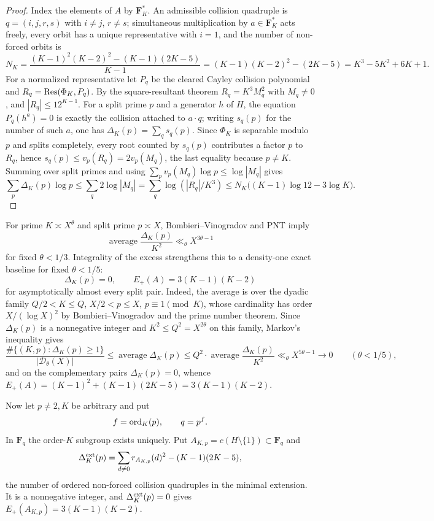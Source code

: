 \begin{proof}
Index the elements of $A$ by $\mathbf F_K^\ast$.  An admissible
collision quadruple is $q=(i,j,r,s)$ with $i\ne j$, $r\ne s$;
simultaneous multiplication by $a\in\mathbf F_K^\ast$ acts freely,
every orbit has a unique representative with $i=1$, and the number
of non-forced orbits is
\[
N_K=\frac{(K-1)^2(K-2)^2-(K-1)(2K-5)}{K-1}
   =(K-1)(K-2)^2-(2K-5)=K^3-5K^2+6K+1.
\]
For a normalized representative let $P_q$ be the cleared Cayley
collision polynomial and $R_q=\operatorname{Res}(\Phi_K,P_q)$.  By the
square-resultant theorem $R_q=K^3M_q^2$ with $M_q\ne0$, and
$|R_q|\le12^{K-1}$.  For a split prime $p$ and a generator $h$ of
$H$, the equation $P_q(h^a)=0$ is exactly the collision attached to
$a\cdot q$; writing $s_q(p)$ for the number of such $a$, one has
$\Delta_K(p)=\sum_q s_q(p)$.  Since $\Phi_K$ is separable modulo
$p$ and splits completely, every root counted by $s_q(p)$
contributes a factor $p$ to $R_q$, hence
$s_q(p)\le v_p(R_q)=2v_p(M_q)$, the last equality because $p\ne K$.
Summing over split primes and using
$\sum_p v_p(M_q)\log p\le\log|M_q|$ gives
\[
\sum_p\Delta_K(p)\log p
\le\sum_q2\log|M_q|
=\sum_q\log(|R_q|/K^3)
\le N_K\bigl((K-1)\log12-3\log K\bigr).
\]
\end{proof}

For prime $K\asymp X^\theta$ and split prime $p\asymp X$,
Bombieri--Vinogradov and PNT \cite{Bombieri1965,IK2004} imply
\[
\operatorname{average}\frac{\Delta_K(p)}{K^2}
 \ll_\theta X^{3\theta-1}
\]
for fixed $\theta<1/3$.  Integrality of the excess strengthens this to a
density-one exact baseline for fixed $\theta<1/5$:
\[
\Delta_K(p)=0,
\qquad
E_+(A)=3(K-1)(K-2)
\]
for asymptotically almost every split pair.
Indeed, the average is over the dyadic family $Q/2<K\le Q$,
$X/2<p\le X$, $p\equiv1\pmod K$, whose cardinality has order
$X/(\log X)^2$ by Bombieri--Vinogradov and the prime number
theorem.  Since $\Delta_K(p)$ is a nonnegative integer and
$K^2\le Q^2=X^{2\theta}$ on this family, Markov's inequality gives
\[
\frac{\#\{(K,p):\Delta_K(p)\ge1\}}{|\mathcal D_\theta(X)|}
\le\operatorname{average}\Delta_K(p)
\le Q^2\cdot\operatorname{average}\frac{\Delta_K(p)}{K^2}
\ll_\theta X^{5\theta-1}\longrightarrow0
\qquad(\theta<1/5),
\]
and on the complementary pairs $\Delta_K(p)=0$, whence
$E_+(A)=(K-1)^2+(K-1)(2K-5)=3(K-1)(K-2)$.

Now let $p\ne2,K$ be arbitrary and put
\[
f=\operatorname{ord}_K(p),\qquad q=p^f.
\]
In $\mathbf F_q$ the order-$K$ subgroup exists uniquely.  Put
$A_{K,p}=c(H\setminus\{1\})\subset\mathbf F_q$ and
\[
\Delta_K^{\rm ext}(p)
 =\sum_{d\ne0}r_{A_{K,p}}(d)^2-(K-1)(2K-5),
\]
the number of ordered non-forced collision quadruples in the
minimal extension.  It is a nonnegative integer, and
$\Delta_K^{\rm ext}(p)=0$ gives $E_+(A_{K,p})=3(K-1)(K-2)$.

